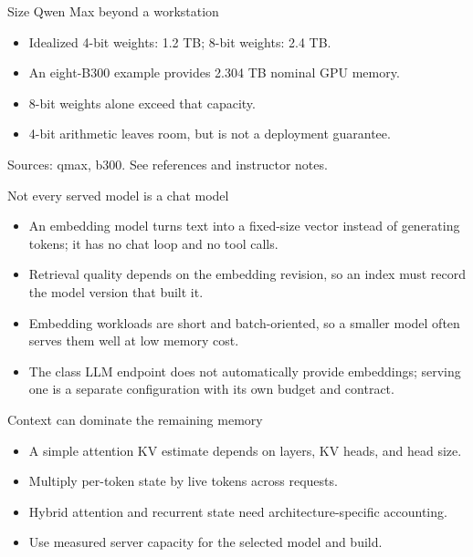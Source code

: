 \documentclass[aspectratio=169,11pt]{beamer}
\begin{document}
\begin{frame}[t,fragile]{Size Qwen Max beyond a workstation}
\fontsize{11.5}{14}\selectfont
\begin{itemize}\setlength{\itemsep}{2mm}
\item Idealized 4-bit weights: 1.2 TB; 8-bit weights: 2.4 TB.
\item An eight-B300 example provides 2.304 TB nominal GPU memory.
\item 8-bit weights alone exceed that capacity.
\item 4-bit arithmetic leaves room, but is not a deployment guarantee.
\end{itemize}
\vfill{\fontsize{6.5}{8}\selectfont\color{UTgray} Sources: qmax, b300. See references and instructor notes.\par}
\end{frame}
\begin{frame}[t,fragile]{Not every served model is a chat model}
\fontsize{11.5}{14}\selectfont
\begin{itemize}\setlength{\itemsep}{2mm}
\item An embedding model turns text into a fixed-size vector instead of generating tokens; it has no chat loop and no tool calls.
\item Retrieval quality depends on the embedding revision, so an index must record the model version that built it.
\item Embedding workloads are short and batch-oriented, so a smaller model often serves them well at low memory cost.
\item The class LLM endpoint does not automatically provide embeddings; serving one is a separate configuration with its own budget and contract.
\end{itemize}
\end{frame}
\begin{frame}[t,fragile]{Context can dominate the remaining memory}
\fontsize{11.5}{14}\selectfont
\begin{itemize}\setlength{\itemsep}{2mm}
\item A simple attention KV estimate depends on layers, KV heads, and head size.
\item Multiply per-token state by live tokens across requests.
\item Hybrid attention and recurrent state need architecture-specific accounting.
\item Use measured server capacity for the selected model and build.
\end{itemize}
\end{frame}
\end{document}
